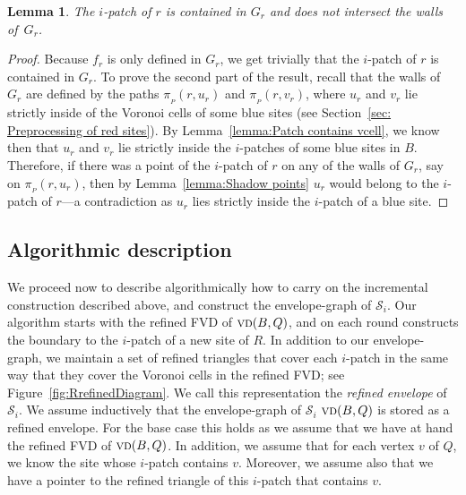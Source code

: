 \documentclass[a4paper, 11pt]{article}
\newtheorem{lemma}[theorem]{Lemma}
\newcommand{\icell}[1][i]{${#1}$-patch\xspace}
\newcommand{\icells}[1][i]{${#1}$-patches\xspace}
\newcommand{\s}{\mathcal S}
\newcommand{\p}[3][P]{\ensuremath{\pi_{_{#1}}(#2, #3)}}
\newcommand{\vd}[2][P]{\textsc{vd}(#2, #1)}
\begin{document}
\begin{lemma}\label{lemma: Patch in G_r}
The \icell of $r$ is contained in $G_r$ and does not intersect the walls of~$G_r$.
\end{lemma}
\begin{proof}
Because $f_r$ is only defined in $G_r$, we get trivially that the \icell of $r$ is contained in $G_r$. To prove the second part of the result,
recall that the walls of $G_r$ are defined by the paths $\p{r}{u_r}$ and $\p{r}{v_r}$, where $u_r$ and $v_r$ lie strictly inside of the Voronoi cells of some blue sites (see Section~\ref{sec: Preprocessing of red sites}).
By Lemma~\ref{lemma:Patch contains vcell}, we know then that $u_r$ and $v_r$ lie strictly inside the \icells of some blue sites in $B$.
Therefore, if there was a point of the \icell of $r$ on any of the walls of $G_r$, say on $\p{r}{u_r}$, then by Lemma~\ref{lemma:Shadow points} $u_r$ would belong to the \icell of $r$---a contradiction as $u_r$ lies strictly inside the \icell of a blue site. 
\end{proof}




\subsection{Algorithmic description} 

We proceed now to describe algorithmically how to carry on the incremental construction described above, and construct the envelope-graph of $\s_i$.
Our algorithm starts with the refined FVD of $\vd[Q]{B}$, and on each round constructs the boundary to the \icell of a new site of $R$. 
In addition to our envelope-graph, we maintain a set of refined triangles that cover each \icell in the same way that they cover the Voronoi cells in the refined FVD; see Figure~\ref{fig:RrefinedDiagram}.
We call this representation the \emph{refined envelope} of $\s_i$.
We assume inductively that the envelope-graph of $\s_i$ $\vd[Q]{B}$ is stored as a refined envelope. 
For the base case this holds as we assume that we have at hand the refined FVD of $\vd[Q]{B}$.
In addition, we assume that for each vertex $v$ of $Q$, we know the site whose \icell contains $v$. 
Moreover, we assume also that we have a pointer to the refined triangle of this \icell that contains $v$.
\end{document}
